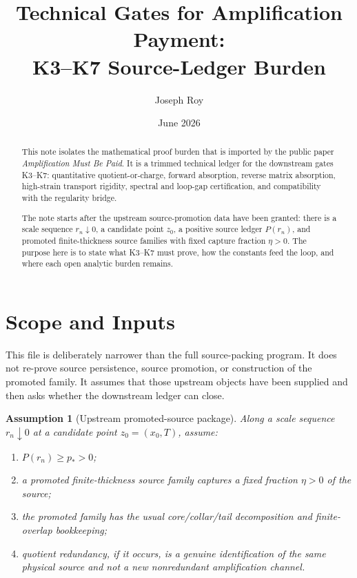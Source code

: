 \documentclass[11pt]{article}
\title{Technical Gates for Amplification Payment:\\
K3--K7 Source-Ledger Burden}
\author{Joseph Roy}
\date{June 2026}
\newtheorem{assumption}{Assumption}
\begin{document}
\maketitle

\begin{abstract}
This note isolates the mathematical proof burden that is imported by the public
paper \emph{Amplification Must Be Paid}.  It is a trimmed technical ledger for
the downstream gates K3--K7: quantitative quotient-or-charge, forward
absorption, reverse matrix absorption, high-strain transport rigidity, spectral
and loop-gap certification, and compatibility with the regularity bridge.

The note starts after the upstream source-promotion data have been granted:
there is a scale sequence \(r_n\downarrow0\), a candidate point \(z_0\), a
positive source ledger \(P(r_n)\), and promoted finite-thickness source
families with fixed capture fraction \(\eta>0\).  The purpose here is to state
what K3--K7 must prove, how the constants feed the loop, and where each open
analytic burden remains.
\end{abstract}

\clearpage
\section{Scope and Inputs}
\label{sec:scope}

This file is deliberately narrower than the full source-packing program.  It
does not re-prove source persistence, source promotion, or construction of the
promoted family.  It assumes that those upstream objects have been supplied and
then asks whether the downstream ledger can close.

\begin{assumption}[Upstream promoted-source package]
\label{ass:upstream-package}
Along a scale sequence \(r_n\downarrow0\) at a candidate point \(z_0=(x_0,T)\),
assume:
\begin{enumerate}
\item \(P(r_n)\ge p_*>0\);
\item a promoted finite-thickness source family captures a fixed fraction
\(\eta>0\) of the source;
\item the promoted family has the usual core/collar/tail decomposition and
finite-overlap bookkeeping;
\item quotient redundancy, if it occurs, is a genuine identification of the
same physical source and not a new nonredundant amplification channel.
\end{enumerate}
\end{assumption}
\end{document}
